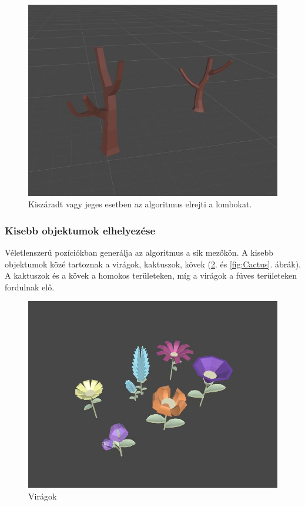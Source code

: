 
\begin{figure}[h!]
\centering
\includegraphics[scale=0.32]{kepek/Tree_Winter.JPG}
\caption[tél]{Kiszáradt vagy jeges esetben az algoritmus elrejti a lombokat. \footnotemark}
\label{fig:Tree_Winter}
\end{figure}


\newpage
\subsubsection{Kisebb objektumok elhelyezése}

Véletlenszerű pozíciókban generálja az algoritmus a sík mezőkön. A kisebb objektumok közé tartoznak a virágok, kaktuszok, kövek (\ref{fig:Flowers}. és \ref{fig:Cactus}. ábrák). A kaktuszok és a kövek a homokos területeken, míg a virágok a füves területeken fordulnak elő. 

\begin{figure}[h!]
\centering
\includegraphics[scale=0.4]{kepek/Flowers.JPG}
\caption[Virágok]{Virágok \footnotemark}
\label{fig:Flowers}
\end{figure}

